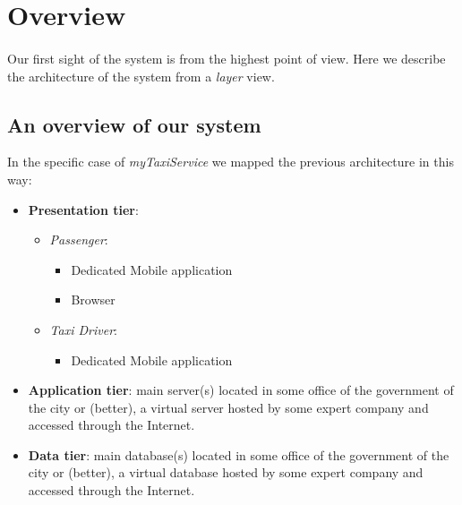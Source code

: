\section{Overview}
\paragraph{}Our first sight of the system is from the highest point of view. Here we describe the architecture of the system from a \textit{layer} view.

\subsection{An overview of our system}
In the specific case of \textit{myTaxiService} we mapped the previous architecture in this way:
\begin{itemize}
	\item \textbf{Presentation tier}:
	\begin{itemize}
		\item \textit{Passenger}:
		\begin{itemize}
			\item Dedicated Mobile application
			\item Browser
		\end{itemize}
		\item \textit{Taxi Driver}:
		\begin{itemize}
			\item Dedicated Mobile application
		\end{itemize}
	\end{itemize}
	\item \textbf{Application tier}: main server(s) located in some office of the government of the city or (better), a virtual server hosted by some expert company and accessed through the Internet.
	\item \textbf{Data tier}: main database(s) located in some office of the government of the city or (better), a virtual database hosted by some expert company and accessed through the Internet. 
\end{itemize}